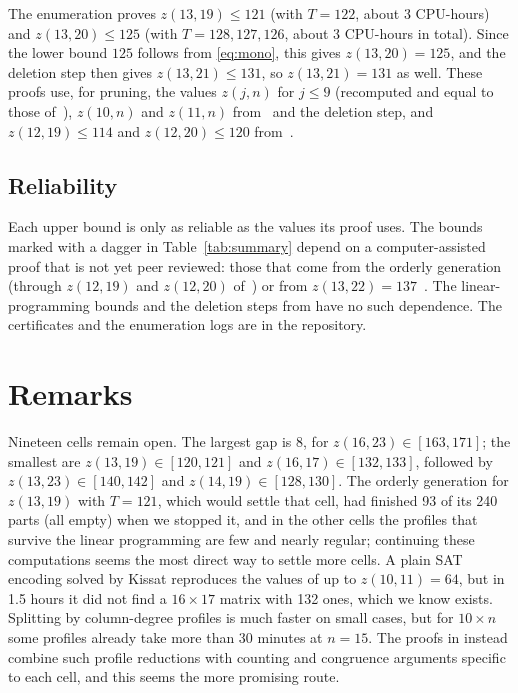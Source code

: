 \documentclass[11pt]{article}
\begin{document}
The enumeration proves $z(13,19)\le121$ (with $T=122$, about 3 CPU-hours)
and $z(13,20)\le125$ (with $T=128,127,126$, about 3 CPU-hours in total).
Since the lower bound $125$ follows from \eqref{eq:mono}, this gives
$z(13,20)=125$, and the deletion step then gives $z(13,21)\le131$, so
$z(13,21)=131$ as well. These proofs use, for pruning, the values
$z(j,n)$ for $j\le9$ (recomputed and equal to those of~\cite{Tan22}),
$z(10,n)$ and $z(11,n)$ from~\cite{Tan22} and the deletion step, and
$z(12,19)\le114$ and $z(12,20)\le120$ from~\cite{Afr26}.

\subsection{Reliability}

Each upper bound is only as reliable as the values its proof uses. The
bounds marked with a dagger in Table~\ref{tab:summary} depend on a
computer-assisted proof that is not yet peer reviewed: those that come from
the orderly generation (through $z(12,19)$ and $z(12,20)$ of~\cite{Afr26})
or from $z(13,22)=137$~\cite{Afr26}. The linear-programming bounds and the
deletion steps from \cite{Tan22,CRWR16} have no such dependence. The
certificates and the enumeration logs are in the repository.

\section{Remarks}

Nineteen cells remain open. The largest gap is $8$, for
$z(16,23)\in[163,171]$; the smallest are $z(13,19)\in[120,121]$ and
$z(16,17)\in[132,133]$, followed by $z(13,23)\in[140,142]$ and
$z(14,19)\in[128,130]$. The orderly generation for $z(13,19)$ with $T=121$,
which would settle that cell, had finished 93 of its 240 parts (all empty)
when we stopped it, and in the other cells the profiles that survive the
linear programming are few and nearly regular; continuing these
computations seems the most direct way to settle more cells. A plain SAT
encoding
solved by Kissat reproduces the values of \cite{Tan22} up to
$z(10,11)=64$, but in 1.5 hours it did not find a $16\times17$ matrix with
132 ones, which we know exists. Splitting by column-degree profiles is much
faster on small cases, but for $10\times n$ some profiles already take more
than 30 minutes at $n=15$. The proofs in \cite{Afr26,Fie26} instead combine
such profile reductions with counting and congruence arguments specific to
each cell, and this seems the more promising route.
\end{document}
